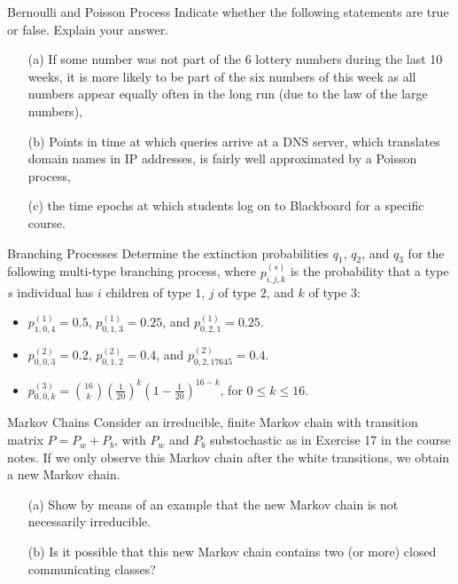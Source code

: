 \begin{problem}{Bernoulli and Poisson Process}
 Indicate whether the following statements are true or false. Explain your answer.
	\begin{itemize}
		\item[(a)] If some number was not part of the 6 lottery numbers during the last 10 weeks, it is more likely to be part of the six numbers of this week as all numbers appear equally often in the long run (due to the law of the large numbers), 
		\item[(b)] Points in time at which queries arrive at a DNS server, which translates domain names in IP addresses, is fairly well approximated by a Poisson process, 
		\item[(c)] the time epochs at which students log on to Blackboard
for a specific course.
	\end{itemize}
\end{problem}

\begin{problem}{Branching Processes}
Determine the extinction probabilities $q_1$, $q_2$, and $q_3$ for the
following multi-type branching process, where $p^{(s)}_{i,j,k}$ is the probability that a type $s$ individual
has $i$ children of type $1$, $j$ of type $2$, and $k$ of type $3$:
\begin{itemize}
    \item $p^{(1)}_{1,0,4} = 0.5$, $p^{(1)}_{0,1,3} = 0.25$, and $p^{(1)}_{0,2,1} = 0.25$.
    \item $p^{(2)}_{0,0,3} = 0.2$, $p^{(2)}_{0,1,2} = 0.4$, and $p^{(2)}_{0,2,17645} = 0.4$.
    \item $p^{(3)}_{0,0,k} = \binom{16}{k} \left( \frac{1}{20} \right)^k \left(1 - \frac{1}{20}\right)^{16 - k}$, for $0 \leq k \leq 16$.
\end{itemize}
\end{problem}

\begin{problem}{Markov Chains}
Consider an irreducible, finite Markov chain with transition matrix
$P = P_w + P_b$, with $P_w$ and $P_b$ substochastic as in Exercise 17 in the course notes. If
we only observe this Markov chain after the white transitions, we obtain a new Markov
chain. 
\begin{itemize}
    \item[(a)] Show by means of an example that the new Markov chain is not necessarily irreducible. 
    \item[(b)] Is it possible that this new Markov chain contains two (or more) closed communicating classes?
\end{itemize}
\end{problem}


